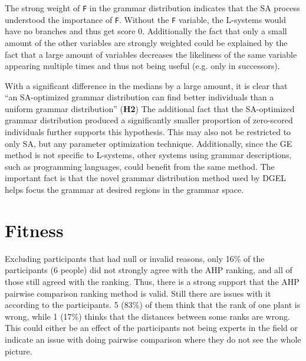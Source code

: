 The strong weight of \texttt{F} in the grammar distribution indicates that the SA process understood the importance of \texttt{F}.
Without the \texttt{F} variable, the L-systems would have no branches and thus get score 0.
Additionally the fact that only a small amount of the other variables are strongly weighted could be explained by the fact that a large amount of variables decreases the likeliness of the same variable appearing multiple times and thus not being useful (e.g. only in successors).

With a significant difference in the medians by a large amount, it is clear that ``an SA-optimized grammar distribution can find better individuals than a uniform grammar distribution'' (\textbf{H2})
The additional fact that the SA-optimized grammar distribution produced a significantly smaller proportion of zero-scored individuals further supports this hypothesis.
This may also not be restricted to only SA, but any parameter optimization technique.
Additionally, since the GE method is not specific to L-systems, other systems using grammar descriptions, such as programming languages, could benefit from the same method.
The important fact is that the novel grammar distribution method used by DGEL helps focus the grammar at desired regions in the grammar space.


\section{Fitness}
Excluding participants that had null or invalid reasons, only 16\% of the participants (6 people) did not strongly agree with the AHP ranking, and all of those still agreed with the ranking.
Thus, there is a strong support that the AHP pairwise comparison ranking method is valid.
Still there are issues with it according to the participants.
5 (83\%) of them think that the rank of one plant is wrong, while 1 (17\%) thinks that the distances between some ranks are wrong.
This could either be an effect of the participants not being experts in the field or indicate an issue with doing pairwise comparison where they do not see the whole picture.

